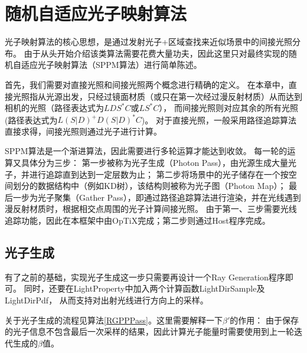 \section{随机自适应光子映射算法}

光子映射算法的核心思想，是通过发射光子+区域查找来近似场景中的间接光照分布。
由于从头开始介绍该类算法需要花费大量功夫，因此这里只对最终实现的随机自适应光子映射算法（SPPM算法）进行简单陈述。

首先，我们需要对直接光照和间接光照两个概念进行精确的定义。
在本章中，直接光照指从光源出发，只经过镜面材质（或只在第一次经过漫反射材质）从而达到相机的光照（路径表达式为$LDS^*C$或$LS^*C$），
而间接光照则对应其余的所有光照(路径表达式为$L(S|D)^+D(S|D)^*C$)。
对于直接光照，一般采用路径追踪算法直接求得，间接光照则通过光子进行计算。

SPPM算法是一个渐进算法，因此需要进行多轮运算才能达到收敛。
每一轮的运算又具体分为三步：
第一步被称为光子生成（Photon Pass），由光源生成大量光子，并进行追踪直到达到一定层数为止；
第二步将场景中的光子储存在一个按空间划分的数据结构中（例如KD树），该结构则被称为光子图（Photon Map）；
最后一步为光子聚集（Gather Pass），即通过路径追踪算法进行渲染，并在光线遇到漫反射材质时，根据相交点周围的光子计算间接光照。
由于第一、三步需要光线追踪功能，因此在本框架中由OpTiX完成；第二步则通过Host程序完成。

\subsection{光子生成}

有了之前的基础，实现光子生成这一步只需要再设计一个Ray Generation程序即可。
同时，还要在LightProperty中加入两个计算函数LightDirSample及LightDirPdf，
从而支持对出射光线进行方向上的采样。

关于光子生成的流程见算法\ref{RGPPPass}。这里需要解释一下$\beta'$的作用：
由于保存的光子信息不包含最后一次采样的结果，因此计算光子能量时需要使用到上一轮迭代生成的$\beta$值。

